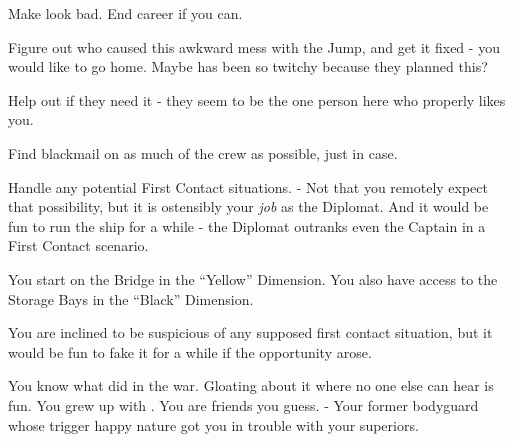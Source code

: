 \documentclass[char]{TMFHope}
\begin{document}
\begin{itemz}[Goals]
	\item Make \cWeap{} look bad. End \cWeap{\their} career if you can.
	\item Figure out who caused this awkward mess with the Jump, and get it fixed - you would like to go home. Maybe \cXO{} has been so twitchy because they planned this?
	\item Help \cMed{} out if they need it - they seem to be the one person here who properly likes you.
	\item Find blackmail on as much of the crew as possible, just in case.
	\item Handle any potential First Contact situations. - Not that you remotely expect that possibility, but it is ostensibly your \emph{job} as the Diplomat. And it would be fun to run the ship for a while - the Diplomat outranks even the Captain in a First Contact scenario.
\end{itemz}

\begin{itemz}[Notes]
	\item You start on the Bridge in the ``Yellow'' Dimension. You also have access to the Storage Bays in the ``Black'' Dimension. 
	\item You are inclined to be suspicious of any supposed first contact situation, but it would be fun to fake it for a while if the opportunity arose.
\end{itemz}

\begin{contacts}
	\contact{\cXO{}} You know what \cXO{\they} did in the war. Gloating about it where no one else can hear is fun.
	\contact{\cMed{}} You grew up with \cMed{\them}. You are friends you guess.
	\contact{\cWeap{}} - Your former bodyguard whose trigger happy nature got you in trouble with your superiors.
\end{contacts}
\end{document}
